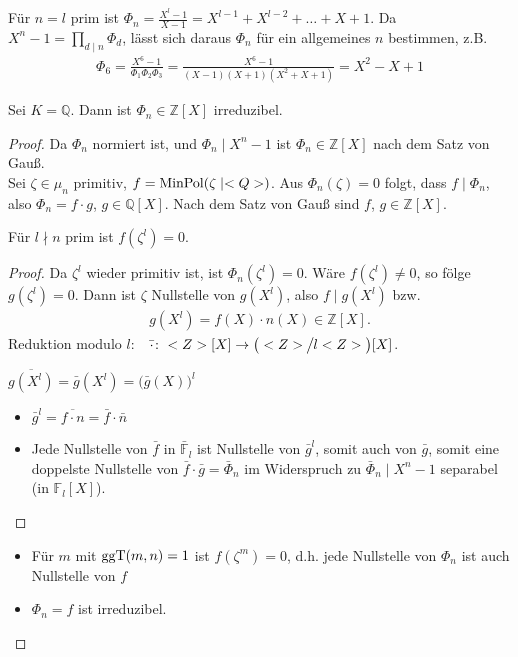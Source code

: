 \begin{remark}
	Für $n=l$ prim ist $\Phi_n = \frac{X^l - 1}{X - 1} = X^{l-1} + X^{l-2} + \dots + X + 1$. Da $X^n - 1 = \prod_{d\mid n} \Phi_d$, lässt sich daraus $\Phi_n$ für ein allgemeines $n$ bestimmen, z.B. \begin{align*}
		\Phi_6 = \frac{X^6 - 1}{\Phi_1\Phi_2\Phi_3} = \frac{X^6 - 1}{(X-1)(X+1)(X^2 + X + 1)} = X^2 - X + 1
	\end{align*}
\end{remark}

\begin{theorem}
	Sei $K=\mathbb Q$. Dann ist $\Phi_n\in\mathbb Z[X]$ irreduzibel.
\end{theorem}

\begin{proof}
	Da $\Phi_n$ normiert ist, und $\Phi_n\mid X^n - 1$ ist $\Phi_n\in \mathbb Z[X]$ nach dem Satz von Gauß.\\
	Sei $\zeta\in \mu_n$ primitiv, $f = \MinPol(\zeta\mid \mathbb Q)$. Aus $\Phi_n(\zeta) = 0$ folgt, dass $f\mid\Phi_n$, also $\Phi_n = f\cdot g$, $g\in\mathbb Q[X]$. Nach dem Satz von Gauß sind $f$, $g\in\mathbb Z[X]$.
	
	\begin{adjustwidth}{1em}{6pt}
	\begin{underlinedenvironment}[Behauptung]
		Für $l\nmid n$ prim ist $f(\zeta^l) = 0$.
	\end{underlinedenvironment}
	\vspace{-\baselineskip}
	\begin{proof}
		Da $\zeta^l$ wieder primitiv ist, ist $\Phi_n(\zeta^l) = 0$. Wäre $f(\zeta^l) \neq 0$, so fölge $g(\zeta^l) = 0$. Dann ist $\zeta$ Nullstelle von $g(X^l)$, also $f\mid g(X^l)$ bzw. \begin{align*}
			g(X^l) = f(X)\cdot n(X)\in\mathbb Z[X].
		\end{align*}
		Reduktion modulo $l$:\ \  $\bar\cdot\colon \mathbb Z[X]\to \big(\mathbb Z\mskip-1mu\big\slash\mskip-1mu l\mathbb Z\big)[X]$.
		
		$\overline{g(X^l)} = \bar g(X^l) = \big( \bar g(X)\big)^l$ \begin{itemize}[topsep=-6pt,label={$\Rightarrow$}]
			\item $\bar g^l = \overline{f\cdot n} = \bar f\cdot \bar n$
			\item Jede Nullstelle von $\bar f$ in $\bar {\mathbb F}_l$ ist Nullstelle von $\bar g^l$, somit auch von $\bar g$, somit eine doppelste Nullstelle von $\bar f\cdot\bar g = \bar \Phi_n$ im Widerspruch zu $\bar \Phi_n\mid X^n-1$ separabel (in $\mathbb F_l[X]$).
		\end{itemize}
	\end{proof}
	\end{adjustwidth}
	\begin{itemize}[label={$\Rightarrow$},left=0pt]
		\item Für $m$ mit $\ggT(m,n) = 1$ ist $f(\zeta^m) = 0$, d.h. jede Nullstelle von $\Phi_n$ ist auch Nullstelle von $f$
		\item $\Phi_n = f$ ist irreduzibel.
	\end{itemize}
\end{proof}

